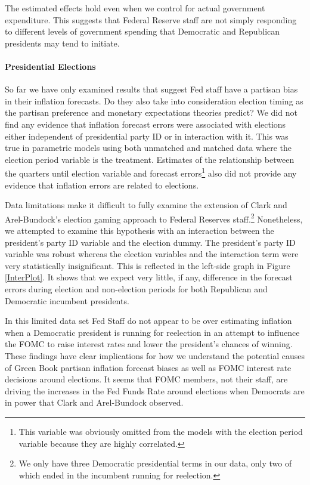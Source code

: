 \documentclass[a4paper]{article}\usepackage{graphicx, color}
\begin{document}
The estimated effects hold even when we control for actual government expenditure. This suggests that Federal Reserve staff are not simply responding to different levels of government spending that Democratic and Republican presidents may tend to initiate.

\paragraph{Presidential Elections}

So far we have only examined results that suggest Fed staff have a partisan bias in their inflation forecasts. Do they also take into consideration election timing as the partisan preference and monetary expectations theories predict? We did not find any evidence that inflation forecast errors were associated with elections either independent of presidential party ID or in interaction with it. This was true in parametric models using both unmatched and matched data where the election period variable is the treatment. Estimates of the relationship between the quarters until election variable and forecast errors\footnote{This variable was obviously omitted from the models with the election period variable because they are highly correlated.} also did not provide any evidence that inflation errors are related to elections. 

Data limitations make it difficult to fully examine the extension of Clark and Arel-Bundock's \citeyearpar{Clark2011} election gaming approach to Federal Reserves staff.\footnote{We only have three Democratic presidential terms in our data, only two of which ended in the incumbent running for reelection.} Nonetheless, we attempted to examine this hypothesis with an interaction between the president's party ID variable and the election dummy. The president's party ID variable was robust whereas the election variables and the interaction term were very statistically insignificant. This is reflected in the left-side graph in Figure \ref{InterPlot}. It shows that we expect very little, if any, difference in the forecast errors during election and non-election periods for both Republican and Democratic incumbent presidents. 

In this limited data set Fed Staff do not appear to be over estimating inflation when a Democratic president is running for reelection in an attempt to influence the FOMC to raise interest rates and lower the president's chances of winning. These findings have clear implications for how we understand the potential causes of Green Book partisan inflation forecast biases as well as FOMC interest rate decisions around elections. It seems that FOMC members, not their staff, are driving the increases in the Fed Funds Rate around elections when Democrats are in power that Clark and Arel-Bundock observed. 
\end{document}
